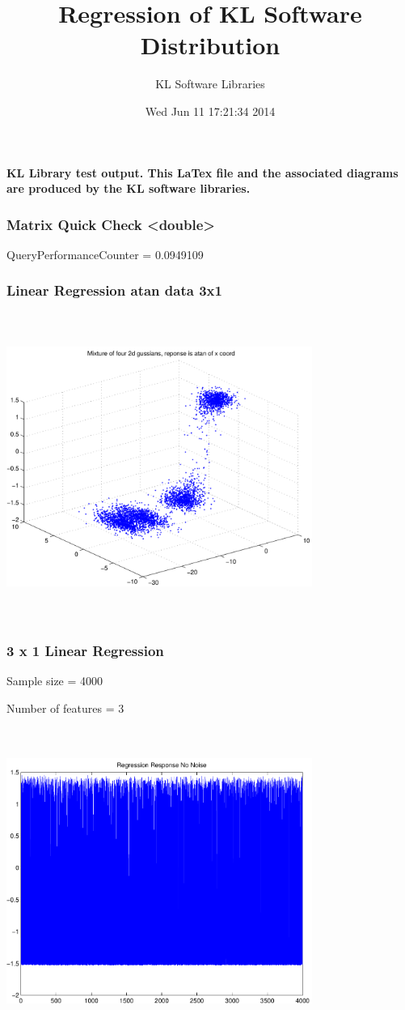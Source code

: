 \documentclass[9pt]{article}
\theoremstyle{plain}
\theoremstyle{definition}
\theoremstyle{remark}
\numberwithin{equation}{section}
\begin{document}
\title{Regression of KL Software Distribution   }
\author{KL Software Libraries}
\date{Wed Jun 11 17:21:34 2014
}
\maketitle
\textbf{ KL Library test output.  This LaTex file and the associated diagrams are produced by the KL software libraries.}
\subsubsection{Matrix Quick Check <double>}
QueryPerformanceCounter  =  0.0949109
\subsubsection{Linear Regression atan data 3x1}
\includegraphics[width=10.0cm,height=10.0cm]{AtanDataSet.pdf}

\subsubsection{3 x 1 Linear Regression}
Sample size = 4000

Number of features = 3

\includegraphics[width=10.0cm,height=10.0cm]{AtanDataSet_regression_response_no_noise.pdf}
\end{document}
